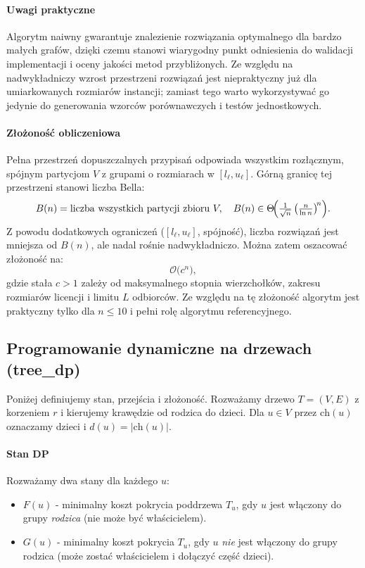 \paragraph{Uwagi praktyczne}
Algorytm naiwny gwarantuje znalezienie rozwiązania optymalnego dla bardzo małych grafów, dzięki czemu stanowi wiarygodny punkt odniesienia do walidacji implementacji i oceny jakości metod przybliżonych. Ze względu na nadwykładniczy wzrost przestrzeni rozwiązań jest niepraktyczny już dla umiarkowanych rozmiarów instancji; zamiast tego warto wykorzystywać go jedynie do generowania wzorców porównawczych i testów jednostkowych.

\paragraph{Złożoność obliczeniowa}
Pełna przestrzeń dopuszczalnych przypisań odpowiada wszystkim rozłącznym, spójnym partycjom $V$ z grupami o rozmiarach w $[l_\ell,u_\ell]$. Górną granicę tej przestrzeni stanowi liczba Bella:
\[
B(n)=\text{liczba wszystkich partycji zbioru }V,\quad
B(n)\in\Theta\!\Bigl(\tfrac{1}{\sqrt n}\,\bigl(\tfrac{n}{\ln n}\bigr)^{\!n}\Bigr).
\]
Z powodu dodatkowych ograniczeń ($[l_\ell,u_\ell]$, spójność), liczba rozwiązań jest mniejsza od $B(n)$, ale nadal rośnie nadwykładniczo. Można zatem oszacować złożoność na:
\[
\mathcal{O}\bigl(c^n\bigr),
\]
gdzie stała $c>1$ zależy od maksymalnego stopnia wierzchołków, zakresu rozmiarów licencji i limitu $L$ odbiorców. Ze względu na tę złożoność algorytm jest praktyczny tylko dla $n\le10$ i pełni rolę algorytmu referencyjnego.

\subsection{Programowanie dynamiczne na drzewach (tree\_dp)}\label{subsec:treedp}
Poniżej definiujemy stan, przejścia i złożoność. Rozważamy drzewo $T=(V,E)$ z korzeniem $r$ i kierujemy krawędzie od rodzica do dzieci. Dla $u\in V$ przez $\mathrm{ch}(u)$ oznaczamy dzieci i $d(u)=|\mathrm{ch}(u)|$.

\paragraph{Stan DP}
Rozważamy dwa stany dla każdego $u$:
\begin{itemize}
  \item $F(u)$ - minimalny koszt pokrycia poddrzewa $T_u$, gdy $u$ jest włączony do grupy \emph{rodzica} (nie może być właścicielem).
  \item $G(u)$ - minimalny koszt pokrycia $T_u$, gdy $u$ \emph{nie} jest włączony do grupy rodzica (może zostać właścicielem i dołączyć część dzieci).
\end{itemize}

